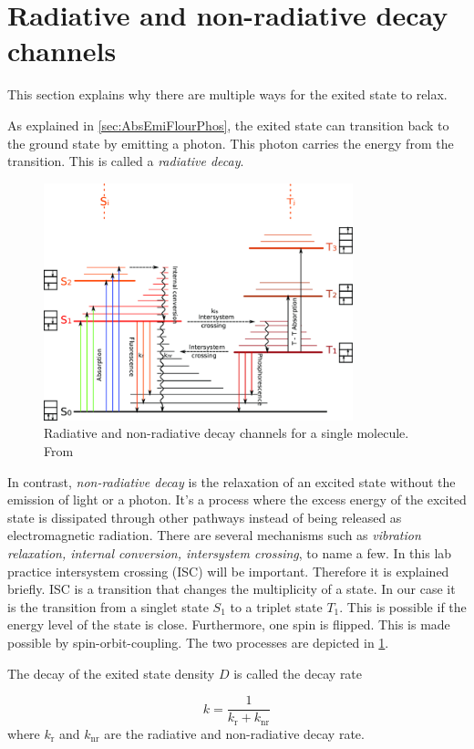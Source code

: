 \section[Decay channels]{Radiative and non-radiative decay channels}
\label{sec:TheoDecayChannels}

This section explains why there are multiple ways for the exited state to relax.

As explained in \cref{sec:AbsEmiFlourPhos}, the exited state can transition back to the ground state by emitting a photon. This 
photon carries the energy from the transition. This is called a \textit{radiative decay}.

\begin{figure}[h]
    \centering
    \includegraphics[width = 0.8\textwidth]{Bilder/Grundlagen/Radiative-and-nonradiative-decay-processes-for-systems-obeying-Kashas-rule-Non.png}
    \caption{Radiative and non-radiative decay channels for a single molecule. From \cite{JulienFrancoisGorenflot.2015}}
    \label{fig:DecyChannels}
\end{figure}

In contrast, \textit{non-radiative decay} is the relaxation of an excited state without the emission of light or a photon. It's a process where the excess energy of the excited state is dissipated through other pathways instead of being released as electromagnetic radiation.
There are several mechanisms such as \textit{vibration relaxation, internal conversion, intersystem crossing}, to name a few. In this lab practice intersystem crossing (ISC) will be important. Therefore it is explained briefly.
ISC is a transition that changes the multiplicity of a state. In our case it is the transition from a singlet state $S_{\mathrm{1}}$ to a triplet state $T_{\mathrm{1}}$. This is possible if the
energy level of the state is close. Furthermore, one spin is flipped. This is made possible by spin-orbit-coupling. The two processes are depicted in \cref{fig:DecyChannels}.

The decay of the exited state density $D$ is called the decay rate 

\begin{equation}
    k = \frac{1}{k_{\mathrm{r}}+k_{\mathrm{nr}}}
\end{equation}
where $k_\mathrm{r}$ and $k_{\mathrm{nr}}$ are the radiative and non-radiative decay rate.